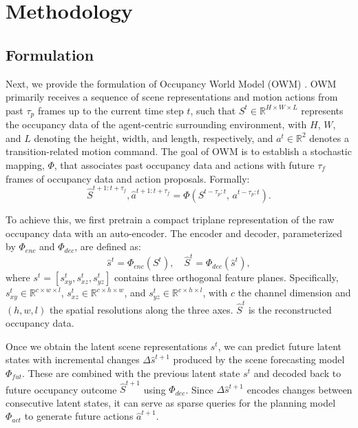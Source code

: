 \documentclass[11pt,a4paper]{article}
\begin{document}
\section{Methodology}

\subsection{Formulation}

Next, we provide the formulation of Occupancy World Model (OWM) \cite{wenzhaozheng2024}.
OWM primarily receives a sequence of scene representations and motion actions from past $\tau_p$ frames up to the current time step $t$, such that $S^t \in \mathbb{R}^{H \times W \times L}$ represents the occupancy data of the agent-centric surrounding environment, with $H$, $W$, and $L$ denoting the height, width, and length, respectively, and $a^t \in \mathbb{R}^2$ denotes a transition-related motion command.
The goal of OWM is to establish a stochastic mapping, $\Phi$, that associates past occupancy data and actions with future $\tau_f$ frames of occupancy data and action proposals.
Formally:
\begin{equation}
  \hat{S}^{t+1:t+\tau_f}, \hat{a}^{t+1:t+\tau_f} = \Phi(S^{t-\tau_p:t},\, a^{t-\tau_p:t}).
  \label{eq:owm}
\end{equation}

To achieve this, we first pretrain a compact triplane representation of the raw occupancy data with an auto-encoder.
The encoder and decoder, parameterized by $\Phi_{enc}$ and $\Phi_{dec}$, are defined as:
\begin{equation}
  \hat{s}^t = \Phi_{enc}(S^t), \quad \hat{S}^t = \Phi_{dec}(\hat{s}^t),
  \label{eq:enc_dec}
\end{equation}
where $s^t = [s^t_{xy}, s^t_{xz}, s^t_{yz}]$ contains three orthogonal feature planes.
Specifically, $s^t_{xy} \in \mathbb{R}^{c \times w \times l}$, $s^t_{xz} \in \mathbb{R}^{c \times h \times w}$, and $s^t_{yz} \in \mathbb{R}^{c \times h \times l}$, with $c$ the channel dimension and $(h, w, l)$ the spatial resolutions along the three axes.
$\hat{S}^t$ is the reconstructed occupancy data.

Once we obtain the latent scene representations $s^t$, we can predict future latent states with incremental changes $\Delta\hat{s}^{t+1}$ produced by the scene forecasting model $\Phi_{fut}$.
These are combined with the previous latent state $s^t$ and decoded back to future occupancy outcome $\hat{S}^{t+1}$ using $\Phi_{dec}$.
Since $\Delta\hat{s}^{t+1}$ encodes changes between consecutive latent states, it can serve as sparse queries for the planning model $\Phi_{act}$ to generate future actions $\hat{a}^{t+1}$.
\end{document}
